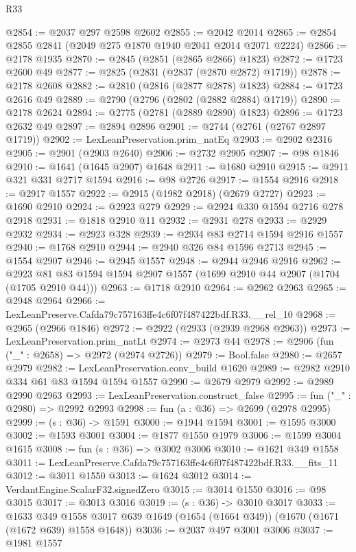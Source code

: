 \begin{lexlean}{R33}
\begin{coremodule}
@2854 := @2037 @297 @2598 @2602
@2855 := @2042 @2014
@2865 := @2854 @2855 @2841 (@2049 @275 @1870 @1940 @2041 @2014 @2071 @2224)
@2866 := @2178 @1935
@2870 := @2845 (@2851 (@2865 @2866) @1823)
@2872 := @1723 @2600 @49
@2877 := @2825 (@2831 (@2837 (@2870 @2872) @1719))
@2878 := @2178 @2608
@2882 := @2810 (@2816 (@2877 @2878) @1823)
@2884 := @1723 @2616 @49
@2889 := @2790 (@2796 (@2802 (@2882 @2884) @1719))
@2890 := @2178 @2624
@2894 := @2775 (@2781 (@2889 @2890) @1823)
@2896 := @1723 @2632 @49
@2897 := @2894 @2896
@2901 := @2744 (@2761 (@2767 @2897 @1719))
@2902 := LexLeanPreservation.prim_natEq
@2903 := @2902 @2316
@2905 := @2901 (@2903 @2640)
@2906 := @2732 @2905
@2907 := @98 @1846
@2910 := @1641 (@1645 @2907) @1648
@2911 := @1680 @2910
@2915 := @2911 @321 @331 @2717 @1594
@2916 := @98 @2726
@2917 := @1554 @2916
@2918 := @2917 @1557
@2922 := @2915 (@1982 @2918) (@2679 @2727)
@2923 := @1690 @2910
@2924 := @2923 @279
@2929 := @2924 @330 @1594 @2716 @278 @2918
@2931 := @1818 @2910 @11
@2932 := @2931 @278
@2933 := @2929 @2932
@2934 := @2923 @328
@2939 := @2934 @83 @2714 @1594 @2916 @1557
@2940 := @1768 @2910
@2944 := @2940 @326 @84 @1596 @2713
@2945 := @1554 @2907
@2946 := @2945 @1557
@2948 := @2944 @2946 @2916
@2962 := @2923 @81 @83 @1594 @1594 @2907 @1557 (@1699 @2910 @44 @2907 (@1704 (@1705 @2910 @44)))
@2963 := @1718 @2910
@2964 := @2962 @2963
@2965 := @2948 @2964
@2966 := LexLeanPreserve.Cafda79c757163ffe4c6f07f487422bdf.R33.__rel_10
@2968 := @2965 (@2966 @1846)
@2972 := @2922 (@2933 (@2939 @2968 @2963))
@2973 := LexLeanPreservation.prim_natLt
@2974 := @2973 @44
@2978 := @2906 (fun ("_" : @2658) => @2972 (@2974 @2726))
@2979 := Bool.false
@2980 := @2657 @2979
@2982 := LexLeanPreservation.conv_build @1620
@2989 := @2982 @2910 @334 @61 @83 @1594 @1594 @1557
@2990 := @2679 @2979
@2992 := @2989 @2990 @2963
@2993 := LexLeanPreservation.construct_false
@2995 := fun ("_" : @2980) => @2992 @2993
@2998 := fun (a : @36) => @2699 (@2978 @2995)
@2999 := (s : @36) -> @1591
@3000 := @1944 @1594
@3001 := @1595 @3000
@3002 := @1593 @3001
@3004 := @1877 @1550 @1979
@3006 := @1599 @3004 @1615
@3008 := fun (s : @36) => @3002 @3006
@3010 := @1621 @349 @1558
@3011 := LexLeanPreserve.Cafda79c757163ffe4c6f07f487422bdf.R33.__fits_11
@3012 := @3011 @1550
@3013 := @1624 @3012
@3014 := VerdantEngine.ScalarF32.signedZero
@3015 := @3014 @1550
@3016 := @98 @3015
@3017 := @3013 @3016
@3019 := (s : @36) -> @3010 @3017
@3033 := @1633
    @349
    @1558
    @3017
    @639
    @1649
    (@1654 (@1664 @349))
    (@1670 (@1671 (@1672 @639) @1558 @1648))
@3036 := @2037 @497 @3001 @3006
@3037 := @1981 @1557

\end{coremodule}
\end{lexlean}

